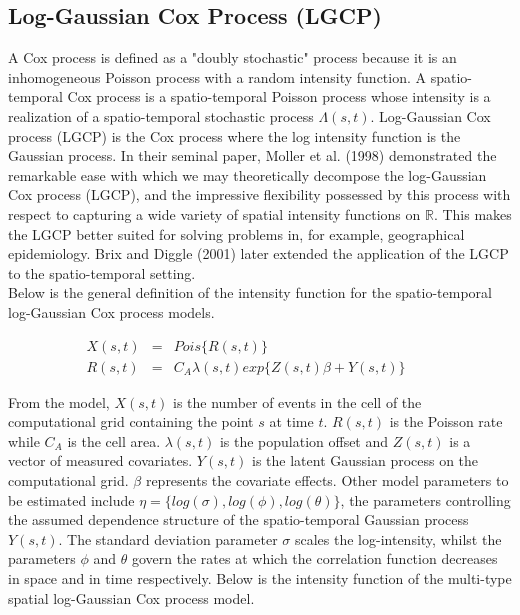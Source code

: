 \documentclass[12pt,a4paper]{report}
\begin{document}
\subsection{Log-Gaussian Cox Process (LGCP)}

A Cox process is defined as a "doubly stochastic" process  because it is an inhomogeneous Poisson process with a random intensity function. A spatio-temporal Cox process is a spatio-temporal Poisson process whose intensity is a realization of a spatio-temporal stochastic process $\Lambda(s,t)$. Log-Gaussian Cox process (LGCP) is the Cox process where the log intensity function is the Gaussian process. In their seminal paper, Moller et al. (1998) demonstrated the remarkable ease with which we may theoretically decompose the log-Gaussian Cox process (LGCP), and the impressive flexibility possessed by this process with respect to capturing a wide variety of spatial intensity functions on $\mathbb{R}$.\cite{Moller} This makes the LGCP better suited for solving problems in, for example, geographical epidemiology.  Brix and Diggle (2001) later extended the application of the LGCP to the spatio-temporal setting.\cite{Diggle2001}\\

Below is the general definition of the intensity function for the spatio-temporal log-Gaussian Cox process models.

\begin{eqnarray}\label{eqn1}
X(s,t) &=& Pois \lbrace R(s,t)\rbrace \nonumber \\
R(s,t) &=& C_A \lambda(s,t) exp \lbrace Z(s,t)\beta + Y(s,t)\rbrace \quad \quad
\end{eqnarray}


From the model, $X(s,t)$ is the number of events in the cell of the computational grid containing the point $s$ at time $t$. $R(s,t)$ is the Poisson rate while $C_A$ is the cell area. $\lambda(s,t)$ is the population offset and $Z(s,t)$ is a vector of measured covariates. $Y(s,t)$ is the latent Gaussian process on the computational grid.  $\beta$ represents the covariate effects. Other model parameters to be estimated include $\eta = \lbrace log(\sigma),log(\phi),log(\theta) \rbrace$, the parameters controlling the assumed dependence structure of the spatio-temporal Gaussian process $Y(s,t)$. The standard deviation parameter $\sigma$ scales the log-intensity, whilst the parameters $\phi$ and $\theta$ govern the rates at which the correlation function decreases in space and in time respectively.\cite{Diggle2013} Below is the intensity function of the multi-type spatial log-Gaussian Cox process model.
\end{document}
